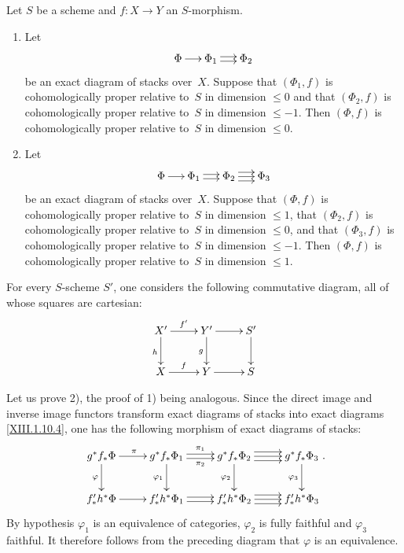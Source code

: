 \begin{proposition}
\label{XIII.1.12}
Let $S$ be a scheme and $f\colon X \to Y$ an $S$-morphism.
\begin{enumerate}
\item[1)] Let
$$
\xymatrix@C=.5cm{ \Phi \ar[r] & \Phi_1 \ar@<2pt>[r] \ar@<-2pt>[r] &
\Phi_2 }
$$
be an exact diagram of stacks over~$X$. Suppose that $(\Phi_1, f)$ is
cohomologically proper relative to~$S$ in dimension
$\leqslant 0$ and that $(\Phi_2, f)$ is cohomologically proper relative to~$S$ in dimension $\leqslant -1$. Then $(\Phi,f)$
is cohomologically proper relative to~$S$ in dimension
$\leqslant 0$.

\item[2)] Let
$$
\xymatrix@C=.5cm{ \Phi \ar[r] & \Phi_1 \ar@<2pt>[r] \ar@<-2pt>[r] &
\Phi_2 \ar@<4pt>[r] \ar[r] \ar@<-4pt>[r] & \Phi_3 }
$$
be an exact diagram of stacks over~$X$. Suppose that $(\Phi,f)$ is
cohomologically proper relative to~$S$ in dimension
$\leqslant 1$, that $(\Phi_2, f)$ is cohomologically proper
relative to~$S$ in dimension $\leqslant 0$, and that
$(\Phi_3, f)$ is cohomologically proper
relative
to~$S$ in dimension $\leqslant -1$. Then $(\Phi,f)$ is
cohomologically proper relative to~$S$ in dimension
$\leqslant 1$.
\end{enumerate}
\end{proposition}

For every $S$-scheme $S'$, one considers the following commutative
diagram, all of whose squares are cartesian:
$$
\xymatrix{ X' \ar[r]^{f'} \ar[d]_h & Y' \ar[r] \ar[d]_g & S' \ar[d] \\
X \ar[r]^f & Y \ar[r] & S }
$$

Let us prove 2), the proof of 1) being
analogous. Since the direct image and inverse image functors
transform exact diagrams of stacks into exact diagrams
\eqref{XIII.1.10.4}, one has the following morphism of exact diagrams of stacks:
$$
\xymatrix{ g^* f_* \Phi \ar[r]^\pi \ar[d]_{\varphi} & g^*
f_* \Phi_1 \ar@<2pt>[r]^{\pi_1} \ar@<-2pt>[r]_{\pi_2}
\ar[d]_{\varphi_1} & g^* f_* \Phi_2 \ar@<4pt>[r] \ar[r]
\ar@<-4pt>[r] \ar[d]_{\varphi_2} & g^* f_* \Phi_3
\ar[d]_{\varphi_3} \\ f'_* h^* \Phi \ar[r] & f'_* h^*
\Phi_1 \ar@<2pt>[r] \ar@<-2pt>[r] & f'_* h^* \Phi_2
\ar@<4pt>[r] \ar[r] \ar@<-4pt>[r] & f'_* h^* \Phi_3 }
\text{.}
$$
By hypothesis $\varphi_1$ is an equivalence of
categories, $\varphi_2$ is fully faithful and $\varphi_3$
faithful. It therefore follows from the preceding diagram that
$\varphi$ is an equivalence.

